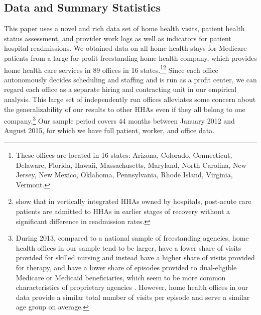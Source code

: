 \documentclass[final,12pt, notitlepage]{article}
\begin{document}
\subsection{Data and Summary Statistics} \label{sec:data_ch3}
This paper uses a novel and rich data set of home health visits, patient health status assessment, and provider work logs as well as indicators for patient hospital readmissions.
We obtained data on all home health stays for Medicare patients from a large for-profit freestanding home health company, which provides home health care services in 89 offices in 16 states.\footnote{These offices are located in 16 states: Arizona, Colorado, Connecticut, Delaware, Florida, Hawaii, Massachusetts, Maryland, North Carolina, New Jersey, New Mexico, Oklahoma, Pennsylvania, Rhode Island, Virginia, Vermont.
}\footnote{\citet{David2013} show that in vertically integrated HHAs owned by hospitals, post-acute care patients are admitted to HHAs in earlier stages of recovery without a significant difference in readmission rates.
}
Since each office autonomously decides scheduling and staffing and is run as a profit center, we can regard each office as a separate hiring and contracting unit in our empirical analysis.
This large set of independently run offices alleviates some concern about the generalizability of our results to other HHAs even if they all belong to one company.\footnote{During 2013, compared to a national sample of freestanding agencies, home health offices in our sample tend to be larger, have a lower share of visits provided for skilled nursing and instead have a higher share of visits provided for therapy, and have a lower share of episodes provided to dual-eligible Medicare or Medicaid beneficiaries, which seem to be more common characteristics of proprietary agencies \citep{Cabin2014, MedPAC2016hh}.
 However, home health offices in our data provide a similar total number of visits per episode and serve a similar age group on average.%
}
Our sample period covers 44 months between January 2012 and August 2015, for which we have full patient, worker, and office data.
\end{document}
